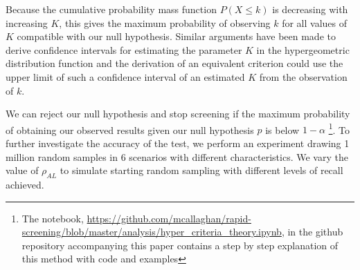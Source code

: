 \documentclass{bmcart}
\begin{document}
	Because the cumulative probability mass function $P(X \leq k)$ is decreasing with increasing $K$, this gives the maximum probability of observing $k$ for all values of $K$ compatible with our null hypothesis. Similar arguments have been made to derive confidence intervals for estimating the parameter $K$ in the hypergeometric distribution function \citep{Buonaccorsi1987, Sahai1995} and the derivation of an equivalent criterion could use the upper limit of such a confidence interval of an estimated $K$ from the observation of $k$.
	
	We can reject our null hypothesis and stop screening if the maximum probability of obtaining our observed results given our null hypothesis $p$ is below $1-\alpha$ \footnote{The notebook, \url{https://github.com/mcallaghan/rapid-screening/blob/master/analysis/hyper_criteria_theory.ipynb}, in the github repository accompanying this paper contains a step by step explanation of this method with code and examples}. To further investigate the accuracy of the test, we perform an experiment drawing 1 million random samples in 6 scenarios with different characteristics. We vary the value of $\rho_{AL}$ to simulate starting random sampling with different levels of recall achieved.
	
\end{document}
